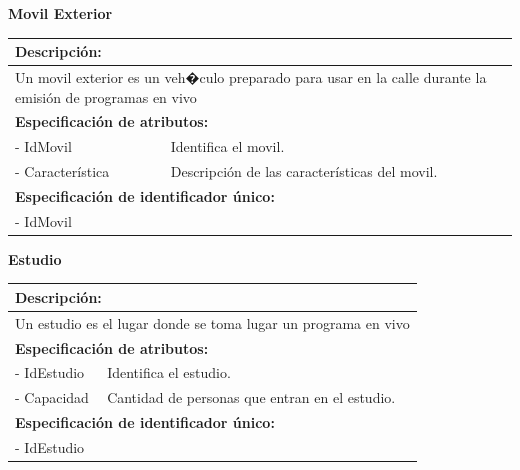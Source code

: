\documentclass[a4paper,10pt]{article}
\begin{document}
  	
  	\begin{flushleft}
      \begin{large} \bf{Movil Exterior} \end{large}
    \end{flushleft}
      \begin{tabular}{| p{2cm} | p{9cm} |}
	\hline
	\multicolumn{2}{|l|}{\bf{Descripci\'on:}} \\
	\hline
	\multicolumn{2}{|l|}{Un movil exterior es un veh�culo preparado para usar en la calle durante la emisi\'on de programas en vivo} \\
	\hline	
	\multicolumn{2}{|l|}{\bf{Especificaci\'on de atributos:}} \\
	\hline
	- IdMovil & Identifica el movil. \\
	\hline \hline
	- Caracter\'istica & Descripci\'on de las caracter\'isticas del movil. \\
	\hline
	\multicolumn{2}{|l|}{\bf{Especificaci\'on de identificador \'unico:}} \\
	\hline
	\multicolumn{2}{|l|}{- IdMovil} \\
	\hline
      \end{tabular}
      
     	\begin{flushleft}
      \begin{large} \bf{Estudio} \end{large}
    \end{flushleft}
      \begin{tabular}{| p{2cm} | p{9cm} |}
	\hline
	\multicolumn{2}{|l|}{\bf{Descripci\'on:}} \\
	\hline
	\multicolumn{2}{|l|}{Un estudio es el lugar donde se toma lugar un programa en vivo} \\
	\hline	
	\multicolumn{2}{|l|}{\bf{Especificaci\'on de atributos:}} \\
	\hline
	- IdEstudio & Identifica el estudio. \\
	\hline \hline
	- Capacidad & Cantidad de personas que entran en el estudio. \\
	\hline
	\multicolumn{2}{|l|}{\bf{Especificaci\'on de identificador \'unico:}} \\
	\hline
	\multicolumn{2}{|l|}{- IdEstudio} \\
	\hline
      \end{tabular} 
      
\end{document}
